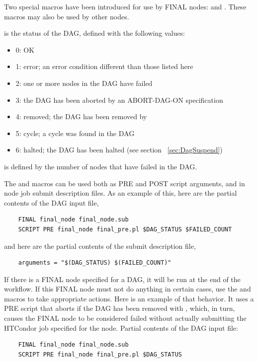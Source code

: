 Two special macros have been introduced for use by FINAL nodes:
 and .
These macros may also be used by other nodes.

 is the status of the DAG,
defined with the following values:
\begin{itemize}
\item 0: OK
\item 1: error; an error condition different than those listed here
\item 2: one or more nodes in the DAG have failed
\item 3: the DAG has been aborted by an ABORT-DAG-ON specification
\item 4: removed; the DAG has been removed by 
\item 5: cycle; a cycle was found in the DAG
\item 6: halted; the DAG has been halted (see section ~\ref{sec:DagSuspend})
\end{itemize}

 is defined by the number of nodes that have failed in the
DAG.

The  and  macros can be used both
as PRE and POST script arguments, and in node job submit description files.
As an example of this, here are the partial contents of the DAG input file,
\begin{verbatim}
    FINAL final_node final_node.sub
    SCRIPT PRE final_node final_pre.pl $DAG_STATUS $FAILED_COUNT
\end{verbatim}

and here are the partial contents of the submit description file, 
\begin{verbatim}
    arguments = "$(DAG_STATUS) $(FAILED_COUNT)"
\end{verbatim}

If there is a FINAL node specified for a DAG, 
it will be run at the end of the workflow.
If this FINAL node must not do anything in certain cases, 
use the  and 
macros to take appropriate actions.  
Here is an example of that behavior.
It uses a PRE script that aborts if the DAG has been removed with ,
which, in turn,
causes the FINAL node to be considered failed without actually submitting the
HTCondor job specified for the node.
Partial contents of the DAG input file:
\begin{verbatim}
    FINAL final_node final_node.sub
    SCRIPT PRE final_node final_pre.pl $DAG_STATUS
\end{verbatim}

